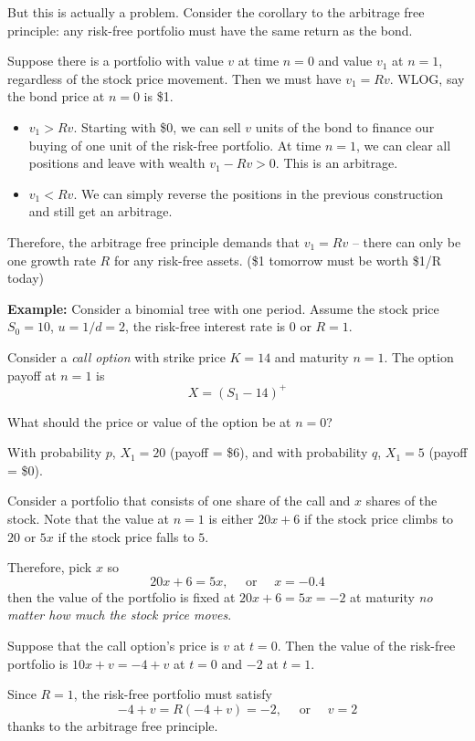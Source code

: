 \documentclass[12pt]{report}
\newcommand*{\tbf}[1]{\ifmmode\mathbf{#1}\else\textbf{#1}\fi}
\begin{document}
    But this is actually a problem. Consider the corollary to the arbitrage free principle: any risk-free portfolio must have the same return as the bond. 

    Suppose there is a portfolio with value $v$ at time $n=0$ and value $v_1$ at $n = 1$, regardless of the stock price movement. Then we must have $v_1 = Rv$. WLOG, say the bond price at $n =0$ is \$1. 
    \begin{itemize}
        \item $v_1 > Rv$. Starting with \$0, we can sell $v$ units of the bond to finance our buying of one unit of the risk-free portfolio. At time $n=1$, we can clear all positions and leave with wealth $v_1 - Rv > 0$. This is an arbitrage. 
        \item $v_1 < Rv$. We can simply reverse the positions in the previous construction and still get an arbitrage.
    \end{itemize} 

    Therefore, the arbitrage free principle demands that $v_1 = Rv$ -- there can only be one growth rate $R$ for any risk-free assets. (\$1 tomorrow must be worth \$1/R today)

    \tbf{Example:} Consider a binomial tree with one period. Assume the stock price $S_0 = 10$, $u = 1/d = 2$, the risk-free interest rate is $0$ or $R=1$. 

    Consider a \emph{call option} with strike price $K = 14$ and maturity $n=1$. The option payoff at $n=1$ is 
    \[X = (S_1 - 14)^+\] 

    What should the price or value of the option be at $n=0$?
    
    With probability $p$, $X_1 = 20$ (payoff = \$6), and with probability $q$, $X_1 = 5$ (payoff = \$0).

    Consider a portfolio that consists of one share of the call and $x$ shares of the stock. Note that the value at $n = 1$ is either $20x + 6$ if the stock price climbs to $20$ or $5x$ if the stock price falls to $5$.

    Therefore, pick $x$ so 
    \[20x + 6 = 5x, \quad \text{ or } \quad x = -0.4\]
    then the value of the portfolio is fixed at $20x + 6 = 5x = -2$ at maturity \emph{no matter how much the stock price moves}.

    Suppose that the call option's price is $v$ at $t = 0$. Then the value of the risk-free portfolio is $10x + v = -4+v$ at $t = 0$ and $-2$ at $t = 1$.

    Since $R=1$, the risk-free portfolio must satisfy 
    \[-4 + v = R(-4 + v) = -2, \quad \text{ or } \quad v = 2\]
    thanks to the arbitrage free principle.
\end{document}
